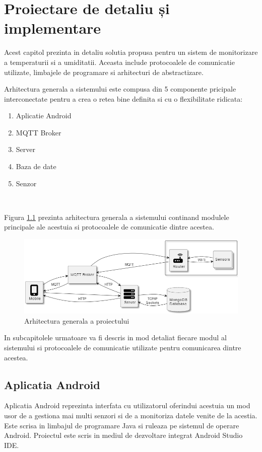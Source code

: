 \chapter{Proiectare de detaliu și implementare}
\pagestyle{fancy}

Acest capitol prezinta in detaliu solutia propusa pentru un sistem de monitorizare a temperaturii si a umiditatii. Aceasta include protocoalele de 
comunicatie utilizate, limbajele de programare si arhitecturi de abstractizare.

Arhitectura generala a sistemului este compusa din 5 componente pricipale interconectate pentru a crea o retea bine definita si cu o flexibilitate
ridicata:
\begin{enumerate}
	\item Aplicatie Android
	\item MQTT Broker
	\item Server
	\item Baza de date
	\item Senzor
\end{enumerate}

\

Figura \ref{fig:ArhitecturaGenerala} prezinta arhitectura generala a sistemului continand modulele principale ale acestuia si protocoalele de comunicatie 
dintre acestea.
\begin{figure}[H]
    \centering
    \includegraphics[scale=0.72]{figs/ArhitecturaGenerala.png}
    \caption{Arhitectura generala a proiectului}
    \label{fig:ArhitecturaGenerala}
\end{figure}

In subcapitolele urmatoare va fi descris in mod detaliat fiecare modul al sistemului si protocoalele de comunicatie utilizate pentru comunicarea dintre 
acestea.

\section{Aplicatia Android}\label{sec:pi_appandroid}
Aplicatia Android reprezinta interfata cu utilizatorul oferindui acestuia un mod usor de a gestiona mai multi senzori si de a monitoriza datele venite de la
acestia. Este scrisa in limbajul de programare Java si ruleaza pe sistemul de operare Android. Proiectul este scris in mediul de dezvoltare integrat Android 
Studio IDE.

